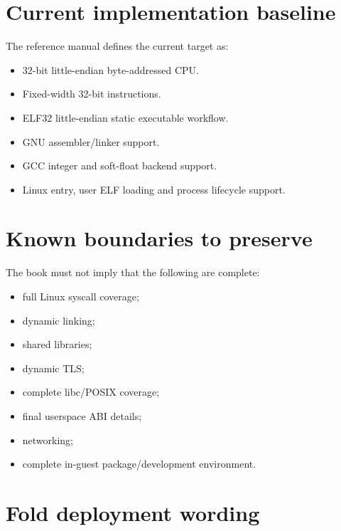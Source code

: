 \documentclass[
  oneside,
  openany]{book}
\providecommand{\tightlist}{%
  \setlength{\itemsep}{0pt}\setlength{\parskip}{0pt}}
\begin{document}
\hypertarget{current-implementation-baseline}{%
\section{Current implementation
baseline}\label{current-implementation-baseline}}

The reference manual defines the current target as:

\begin{itemize}
\tightlist
\item
  32-bit little-endian byte-addressed CPU.
\item
  Fixed-width 32-bit instructions.
\item
  ELF32 little-endian static executable workflow.
\item
  GNU assembler/linker support.
\item
  GCC integer and soft-float backend support.
\item
  Linux entry, user ELF loading and process lifecycle support.
\end{itemize}

\hypertarget{known-boundaries-to-preserve}{%
\section{Known boundaries to
preserve}\label{known-boundaries-to-preserve}}

The book must not imply that the following are complete:

\begin{itemize}
\tightlist
\item
  full Linux syscall coverage;
\item
  dynamic linking;
\item
  shared libraries;
\item
  dynamic TLS;
\item
  complete libc/POSIX coverage;
\item
  final userspace ABI details;
\item
  networking;
\item
  complete in-guest package/development environment.
\end{itemize}

\hypertarget{fold-deployment-wording}{%
\section{Fold deployment wording}\label{fold-deployment-wording}}
\end{document}
